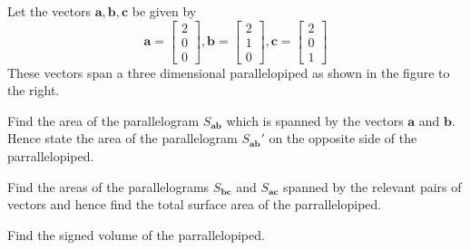 \documentclass[11pt,a4paper,titlepage,oneside,openany]{article}
\numberwithin{equation}{section}
\numberwithin{algorithm}{section}
\numberwithin{figure}{section}
\numberwithin{table}{section}
\renewcommand{\vec}[1]{\mathbf{#1}}
\begin{document}
Let the vectors $\vec{a},\vec{b},\vec{c}$ be given by
  \begin{equation*}
    \vec{a}=\left[ \begin{array}{c} 2 \\ 0 \\ 0 \end{array}\right],
    \vec{b}=\left[ \begin{array}{c} 2 \\ 1 \\ 0 \end{array}\right],
    \vec{c}=\left[ \begin{array}{c} 2 \\ 0 \\ 1 \end{array}\right]
  \end{equation*}
  These vectors span a three dimensional parallelopiped as shown in the figure to the right.

  \begin{enumerate}
    \renewcommand{\theenumi}{\roman{enumi})}
    \renewcommand{\labelenumi}{\theenumi}
  {\setlength\itemindent{3em} \item
    Find the area of the parallelogram $S_{\vec{a}\vec{b}}$ which is spanned by the vectors $\vec{a}$ and $\vec{b}$. Hence state the area of the parallelogram $S_{\vec{a}\vec{b}}'$ on the opposite side of the parrallelopiped.}
  {\setlength\itemindent{3em} \item
    Find the areas of the parallelograms $S_{\vec{b}\vec{c}}$ and $S_{\vec{a}\vec{c}}$ spanned by the relevant pairs of vectors and hence find the total surface area of the parrallelopiped.}
  {\setlength\itemindent{3em} \item
    Find the signed volume of the parrallelopiped.}
  \end{enumerate}
\end{document}
